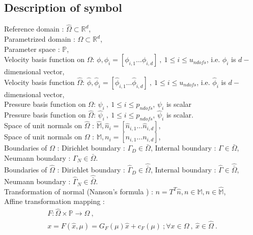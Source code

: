 \documentclass[a4paper,oneside,openright,spanish,english]{book}
\begin{document}
\begin{appendices}

\section{Description of symbol}

Reference domain : $\hat{\Omega} \subset \mathbb{R}^d$, \\
Parametrized domain : $\Omega \subset \mathbb{R}^d$, \\
Parameter space : $\mathbb{P}$, \\
Velocity basis function on $\Omega$: $\phi, \phi_i = [\phi_{i,1} \ldots \phi_{i,d}] \ , \ 1 \leq i \leq u_{ndofs}$, i.e. $\phi_i$ is $d-$dimensional vector,\\
Velocity basis function $\hat{\Omega}$: $\hat{\phi}, \hat{\phi}_i = [\hat{\phi}_{i,1} \ldots \hat{\phi}_{i,d}] \ , \ 1 \leq i \leq u_{ndofs}$, i.e. $\hat{\phi}_i$ is $d-$dimensional vector,\\
Pressure basis function on $\Omega$: $\psi_i \ , \  1 \leq i \leq p_{ndofs}$, $\psi_i$ is scalar\\
Pressure basis function on $\hat{\Omega}$: $\hat{\psi}_i \ , \ 1 \leq i \leq p_{ndofs}$, $\hat{\psi}_i$ is scalar.\\
Space of unit normals on $\hat{\Omega}$ : $\hat{\mathbb{M}}, \hat{n}_{i} = [\hat{n}_{i,1} \ldots \hat{n}_{i,d}]$, \\
Space of unit normals on $\Omega$ : $\mathbb{M}, n_i = [n_{i,1} \ldots n_{i,d}]$, \\
Boundaries of $\Omega$ : Dirichlet boundary : $\Gamma_D \in \bar{\Omega}$, Internal boundary : $\Gamma \in \bar{\Omega}$, Neumann boundary : $\Gamma_N \in \bar{\Omega}$.\\
Boundaries of $\hat{\Omega}$ : Dirichlet boundary : $\hat{\Gamma}_D \in \hat{\bar{\Omega}}$, Internal boundary : $\hat{\Gamma} \in \hat{\bar{\Omega}}$, Neumann boundary : $\hat{\Gamma}_N \in \hat{\bar{\Omega}}$.\\
Transformation of normal (Nanson's formula \cite{nanson_formula}) : $n = T^T \hat{n}, n \in \mathbb{M}, \hat{n} \in \hat{\mathbb{M}}$, \\
Affine transformation mapping : 
\begin{gather*} 
F : \hat{\Omega} \times \mathbb{P} \rightarrow \Omega \ , \\
x = F(\hat{x},\mu) = G_F(\mu)\hat{x} + c_F(\mu) \ ; \forall x \in \Omega \ , \ \hat{x} \in \hat{\Omega} \ .
\end{gather*}

\end{appendices}
\end{document}
